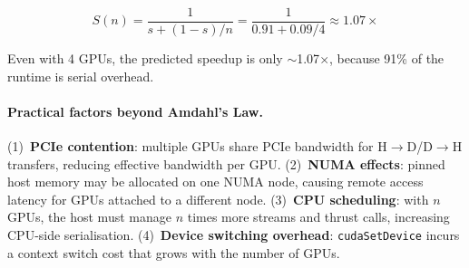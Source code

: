 \documentclass[
hf,
]{confart}
\begin{document}
\[
S(n) = \frac{1}{s + (1-s)/n} = \frac{1}{0.91 + 0.09/4} \approx 1.07\times
\]

Even with 4 GPUs, the predicted speedup is only $\sim$1.07$\times$, because 91\% of the runtime is serial overhead.

\paragraph{Practical factors beyond Amdahl's Law.}
(1)~\textbf{PCIe contention}: multiple GPUs share PCIe bandwidth for H$\to$D/D$\to$H transfers, reducing effective bandwidth per GPU. (2)~\textbf{NUMA effects}: pinned host memory may be allocated on one NUMA node, causing remote access latency for GPUs attached to a different node. (3)~\textbf{CPU scheduling}: with $n$ GPUs, the host must manage $n$ times more streams and thrust calls, increasing CPU-side serialisation. (4)~\textbf{Device switching overhead}: \texttt{cudaSetDevice} incurs a context switch cost that grows with the number of GPUs.
\end{document}
